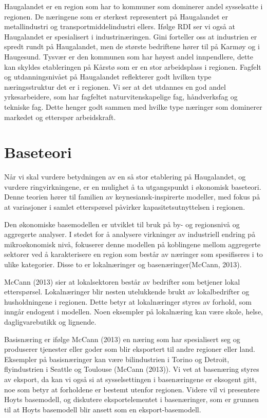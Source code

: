 \documentclass[
]{article}
\begin{document}
Haugalandet er en region som har to kommuner som dominerer andel
sysselsatte i regionen. De næringene som er sterkest representert på
Haugalandet er metallindustri og transportmiddelindustri ellers. Ifølge
RDI ser vi også at Haugalandet er spesialisert i industrinæringen. Gini
forteller oss at industrien er spredt rundt på Haugalandet, men de
største bedriftene hører til på Karmøy og i Haugesund. Tysvær er den
kommunen som har høyest andel innpendlere, dette kan skyldes
etableringen på Kårstø som er en stor arbeidsplass i regionen. Fagfelt
og utdanningsnivået på Haugalandet reflekterer godt hvilken type
næringsstruktur det er i regionen. Vi ser at det utdannes en god andel
yrkesarbeidere, som har fagfeltet naturvitenskapelige fag, håndverksfag
og tekniske fag. Dette henger godt sammen med hvilke type næringer som
dominerer markedet og etterspør arbeidskraft.

\hypertarget{baseteori}{%
\section{Baseteori}\label{baseteori}}

Når vi skal vurdere betydningen av en så stor etablering på Haugalandet,
og vurdere ringvirkningene, er en mulighet å ta utgangspunkt i økonomisk
baseteori. Denne teorien hører til familien av keynesiansk-inspirerte
modeller, med fokus på at variasjoner i samlet etterspørsel påvirker
kapasitetsutnyttelsen i regionen.

Den økonomiske basemodellen er utviklet til bruk på by- og regionsnivå
og aggregerte analyser. I stedet for å analysere virkninger av
industriell endring på mikroøkonomisk nivå, fokuserer denne modellen på
koblingene mellom aggregerte sektorer ved å karakterisere en region som
består av næringer som spesifiseres i to ulike kategorier. Disse to er
lokalnæringer og basenæringer(McCann, 2013).

McCann (2013) sier at lokalsektoren består av bedrifter som betjener
lokal etterspørsel. Lokalnæringer blir nesten utelukkende brukt av
lokalbedrifter og husholdningene i regionen. Dette betyr at
lokalnæringer styres av forhold, som inngår endogent i modellen. Noen
eksempler på lokalnæring kan være skole, helse, dagligvarebutikk og
lignende.

Basisnæring er ifølge McCann (2013) en næring som har spesialisert seg
og produserer tjenester eller goder som blir eksportert til andre
regioner eller land. Eksempler på basisnæringer kan være bilindustrien i
Torino og Detroit, flyindustrien i Seattle og Toulouse (McCann (2013)).
Vi vet at basenæring styres av eksport, da kan vi også si at
sysselsettingen i basenæringene er eksogent gitt, noe som betyr at
forholdene er bestemt utenfor regionen. Videre vil vi presentere Hoyts
basemodell, og diskutere eksportelementet i basenæringer, som er grunnen
til at Hoyts basemodell blir ansett som en eksport-basemodell.
\end{document}
